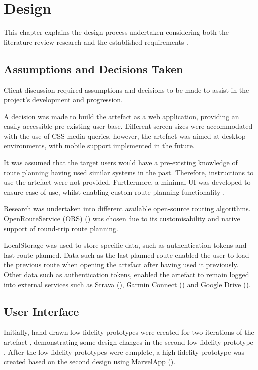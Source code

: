 \chapter{Design}
\label{chap:design}

This chapter explains the design process undertaken considering both the literature review research  and the established requirements .
\section{Assumptions and Decisions Taken}
\label{design:assumptions/decisions}

Client discussion required assumptions and decisions to be made to assist in the project's development and progression.

A decision was made to build the artefact as a web application, providing an easily accessible pre-existing user base. Different screen sizes were accommodated with the use of CSS media queries, however, the artefact was aimed at desktop environments, with mobile support implemented in the future. 

It was assumed that the target users would have a pre-existing knowledge of route planning having used similar systems in the past. Therefore, instructions to use the artefact were not provided. Furthermore, a minimal UI was developed to ensure ease of use, whilst enabling custom route planning functionality .

Research was undertaken into different available open-source routing algorithms. OpenRouteService (ORS) (\cite{noauthor_openrouteservice_nodate}) was chosen due to its customisability and native support of round-trip route planning.

LocalStorage was used to store specific data, such as authentication tokens and last route planned. Data such as the last planned route enabled the user to load the previous route when opening the artefact after having used it previously. Other data such as authentication tokens, enabled the artefact to remain logged into external services such as Strava (\cite{noauthor_strava_nodate}), Garmin Connect (\cite{international_garmin_nodate}) and Google Drive (\cite{noauthor_home_nodate}).

\section{User Interface}
\label{design:ui}
Initially, hand-drawn low-fidelity prototypes were created for two iterations of the artefact , demonstrating some design changes in the second low-fidelity prototype . After the low-fidelity prototypes were complete, a high-fidelity prototype was created based on the second design using MarvelApp (\cite{noauthor_marvel_nodate}).

